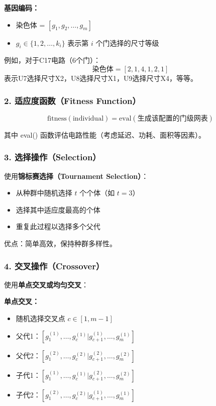 \documentclass[UTF8,12pt,a4paper]{ctexart}
\begin{document}
\textbf{基因编码：}
\begin{itemize}
	\item 染色体 = $[g_1, g_2, \ldots, g_m]$
	\item $g_i \in \{1, 2, \ldots, k_i\}$ 表示第 $i$ 个门选择的尺寸等级
\end{itemize}

例如，对于C17电路（6个门）：
$$\text{染色体} = [2, 1, 4, 1, 2, 1]$$
表示U7选择尺寸X2，U8选择尺寸X1，U9选择尺寸X4，等等。

\subsubsection*{2. 适应度函数（Fitness Function）}

$$\text{fitness}(\text{individual}) = \text{eval}(\text{生成该配置的门级网表})$$

其中 eval() 函数评估电路性能（考虑延迟、功耗、面积等因素）。

\subsubsection*{3. 选择操作（Selection）}

使用\textbf{锦标赛选择（Tournament Selection）}：
\begin{itemize}
	\item 从种群中随机选择 $t$ 个个体（如 $t = 3$）
	\item 选择其中适应度最高的个体
	\item 重复此过程以选择多个父代
\end{itemize}

优点：简单高效，保持种群多样性。

\subsubsection*{4. 交叉操作（Crossover）}

使用\textbf{单点交叉或均匀交叉}：

\textbf{单点交叉：}
\begin{itemize}
	\item 随机选择交叉点 $c \in [1, m-1]$
	\item 父代1：$[g_1^{(1)}, \ldots, g_c^{(1)} | g_{c+1}^{(1)}, \ldots, g_m^{(1)}]$
	\item 父代2：$[g_1^{(2)}, \ldots, g_c^{(2)} | g_{c+1}^{(2)}, \ldots, g_m^{(2)}]$
	\item 子代1：$[g_1^{(1)}, \ldots, g_c^{(1)} | g_{c+1}^{(2)}, \ldots, g_m^{(2)}]$
	\item 子代2：$[g_1^{(2)}, \ldots, g_c^{(2)} | g_{c+1}^{(1)}, \ldots, g_m^{(1)}]$
\end{itemize}
\end{document}

